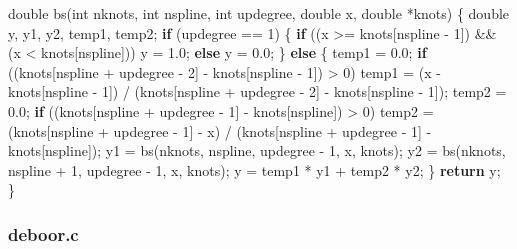 \documentclass[
  12pt,
]{article}
\newenvironment{Shaded}{\begin{snugshade}}{\end{snugshade}}
\newcommand{\ControlFlowTok}[1]{\textcolor[rgb]{0.13,0.29,0.53}{\textbf{#1}}}
\newcommand{\DataTypeTok}[1]{\textcolor[rgb]{0.13,0.29,0.53}{#1}}
\newcommand{\DecValTok}[1]{\textcolor[rgb]{0.00,0.00,0.81}{#1}}
\newcommand{\FloatTok}[1]{\textcolor[rgb]{0.00,0.00,0.81}{#1}}
\newcommand{\NormalTok}[1]{#1}
\begin{document}
\begin{Shaded}
\begin{Highlighting}[]
\DataTypeTok{double}\NormalTok{ bs(}\DataTypeTok{int}\NormalTok{ nknots, }\DataTypeTok{int}\NormalTok{ nspline, }\DataTypeTok{int}\NormalTok{ updegree, }\DataTypeTok{double}\NormalTok{ x, }\DataTypeTok{double}\NormalTok{ *knots) \{}
    \DataTypeTok{double}\NormalTok{ y, y1, y2, temp1, temp2;}
    \ControlFlowTok{if}\NormalTok{ (updegree == }\DecValTok{1}\NormalTok{) \{}
        \ControlFlowTok{if}\NormalTok{ ((x \textgreater{}= knots[nspline {-} }\DecValTok{1}\NormalTok{]) \&\& (x \textless{} knots[nspline]))}
\NormalTok{            y = }\FloatTok{1.0}\NormalTok{;}
        \ControlFlowTok{else}
\NormalTok{            y = }\FloatTok{0.0}\NormalTok{;}
\NormalTok{    \} }\ControlFlowTok{else}\NormalTok{ \{}
\NormalTok{        temp1 = }\FloatTok{0.0}\NormalTok{;}
        \ControlFlowTok{if}\NormalTok{ ((knots[nspline + updegree {-} }\DecValTok{2}\NormalTok{] {-} knots[nspline {-} }\DecValTok{1}\NormalTok{]) \textgreater{} }\DecValTok{0}\NormalTok{)}
\NormalTok{            temp1 = (x {-} knots[nspline {-} }\DecValTok{1}\NormalTok{]) /}
\NormalTok{                    (knots[nspline + updegree {-} }\DecValTok{2}\NormalTok{] {-} knots[nspline {-} }\DecValTok{1}\NormalTok{]);}
\NormalTok{        temp2 = }\FloatTok{0.0}\NormalTok{;}
        \ControlFlowTok{if}\NormalTok{ ((knots[nspline + updegree {-} }\DecValTok{1}\NormalTok{] {-} knots[nspline]) \textgreater{} }\DecValTok{0}\NormalTok{)}
\NormalTok{            temp2 = (knots[nspline + updegree {-} }\DecValTok{1}\NormalTok{] {-} x) /}
\NormalTok{                    (knots[nspline + updegree {-} }\DecValTok{1}\NormalTok{] {-} knots[nspline]);}
\NormalTok{        y1 = bs(nknots, nspline, updegree {-} }\DecValTok{1}\NormalTok{, x, knots);}
\NormalTok{        y2 = bs(nknots, nspline + }\DecValTok{1}\NormalTok{, updegree {-} }\DecValTok{1}\NormalTok{, x, knots);}
\NormalTok{        y = temp1 * y1 + temp2 * y2;}
\NormalTok{    \}}
    \ControlFlowTok{return}\NormalTok{ y;}
\NormalTok{\}}
\end{Highlighting}
\end{Shaded}

\hypertarget{deboor.c}{%
\subsubsection{deboor.c}\label{deboor.c}}
\end{document}
